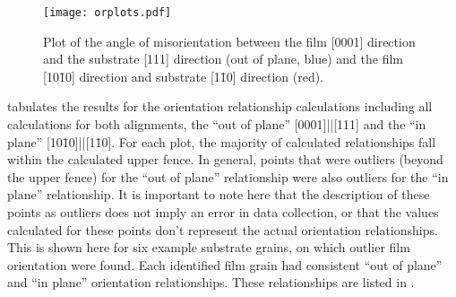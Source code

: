 \begin{figure}

	\begin{center}
\texttt{[image: orplots.pdf]}
		\caption[Plot of film-substrate misorientations]{%
			Plot of the angle of misorientation between the film
			[0001] direction and the substrate [111] direction (out of plane, 
			blue) and the film [10\={1}0] direction and substrate [1\={1}0] 
			direction (red).}
	\label{fig:orplots}
\end{center}
\end{figure}
 tabulates the results for the orientation relationship calculations including all calculations for both alignments, the ``out of plane'' [0001]||[111] and the ``in plane'' [10\={1}0]||[1\={1}0]. For each plot, the majority of calculated relationships fall within the calculated upper fence. In general, points that were outliers (beyond the upper fence) for the ``out of plane'' relationship were also outliers for the ``in plane'' relationship. It is important to note here that the description of these points as outliers does not imply an error in data collection, or that the values calculated for these points don't represent the actual orientation relationships. This is shown here for six example substrate grains, on which outlier film orientation were found. Each identified film grain had consistent ``out of plane'' and ``in plane'' orientation relationships. These relationships are listed in .
